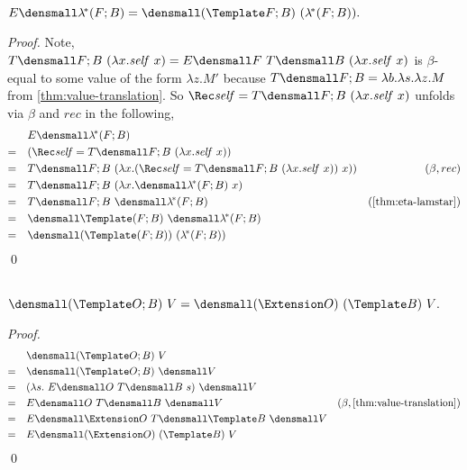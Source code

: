 \begin{lemma}
  \label{thm:unfold-lamstar}
    $ E\den{ \lamstar (F; B)} = \den{(\Template F; B) ~ (\lamstar (F; B))}.$
\end{lemma}
\begin{proof}
  Note,
  \begin{math}
    T\den{F; B} ~ (\lambda x. \mathit{self} ~ x)
    =
    E\den{F} ~ T\den{B} ~ (\lambda x. \mathit{self} ~ x)    
  \end{math}
  is $\beta$-equal to some value of the form $\lambda z. M'$ because
  $T\den{F; B} = \lambda b. \lambda s. \lambda z. M$ from
  \cref{thm:value-translation}.  So
  $\Rec \mathit{self} = T\den{F; B} ~ (\lambda x. \mathit{self} ~ x)$ unfolds
  via $\beta$ and $rec$ in the following,
  \begin{align*}
    &\quad
    E\den{ \lamstar (F; B)}
    \\
    =& \quad
    (\Rec \mathit{self} = T\den{F; B} ~ (\lambda x. \mathit{self} ~ x))
    \\
    =& \quad
    T\den{F; B}
    ~
    (\lambda x.
    (\Rec \mathit{self} = T\den{F; B} ~ (\lambda x. \mathit{self} ~ x))
    ~ x)
    )
    & (\beta, rec)
    \\
    =& \quad
    T\den{F; B} ~ (\lambda x. \den{\lamstar(F; B)} ~ x)
    \\
    =& \quad
    T\den{F; B} ~ \den{\lamstar(F; B)}
    & (\cref{thm:eta-lamstar})
    \\
    =& \quad
    \den{\Template (F; B)} ~ \den{\lamstar (F; B)}
    \\
    =& \quad
    \den{(\Template (F; B)) ~ (\lamstar (F; B))}
  \end{align*}
  \qed
\end{proof}

\begin{lemma}
  \label{thm:templ-ext}
  \\
  $ \den{(\Template O; B) ~ V} = \den{(\Extension O) ~ (\Template B) ~ V}.$
\end{lemma}
\begin{proof}
  \begin{align*}
    &\quad \den{(\Template O; B) ~ V} \\
    =& \quad \den{(\Template O; B)} ~ \den{V} \\
    =& \quad (\lambda s. ~E\den{O} ~T\den{B} ~s) ~ \den{V} \\
    =& \quad E\den{O} ~T\den{B} ~ \den{V} & (\beta, \cref{thm:value-translation}) \\
    =& \quad E\den{\Extension O} ~T\den{\Template B} ~ \den{V} \\
    =& \quad E\den{(\Extension O) ~ (\Template B) ~ V}
  \end{align*}
  \qed
\end{proof}

